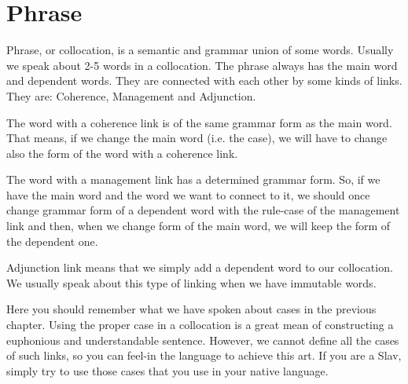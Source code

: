 \chapter{Phrase}

Phrase, or collocation, is a semantic and grammar union of some words. Usually we speak about 2-5 words in a collocation. The phrase always has the main word and dependent words. They are connected with each other by some kinds of links. They are: Coherence, Management and Adjunction.

The word with a coherence link is of the same grammar form as the main word. That means, if we change the main word (i.e. the case), we will have to change also the form of the word with a coherence link.

The word with a management link has a determined grammar form. So, if we have the main word and the word we want to connect to it, we should once change grammar form of a dependent word with the rule-case of the management link and then, when we change form of the main word, we will keep the form of the dependent one.

Adjunction link means that we simply add a dependent word to our collocation. We usually speak about this type of linking when we have immutable words.

Here you should remember what we have spoken about cases in the previous chapter. Using the proper case in a collocation is a great mean of constructing a euphonious and understandable sentence. However, we cannot define all the cases of such links, so you can feel-in the language to achieve this art. If you are a Slav, simply try to use those cases that you use in your native language.


